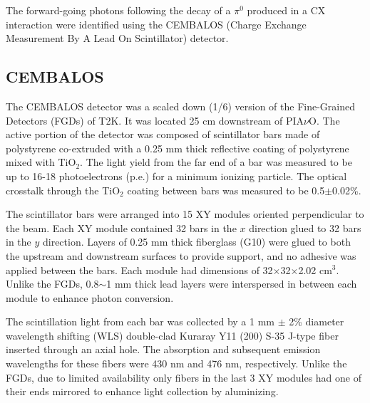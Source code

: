 The forward-going photons following the decay of a $\pi^0$ produced in a CX interaction were identified using the CEMBALOS (Charge Exchange Measurement By A Lead On Scintillator) detector.

\subsection{CEMBALOS}
The CEMBALOS detector was a scaled down (1/6) version of the Fine-Grained Detectors (FGDs) \cite{fgd} of T2K. It was located 25 cm downstream of PIA$\nu$O. {\color{red}The active portion of the detector was composed of} scintillator bars made of polystyrene co-extruded with a 0.25 mm thick reflective coating of polystyrene mixed with TiO$_2$. The light yield from the far end of a bar was measured to be up to 16-18 photoelectrons (p.e.) for a minimum ionizing particle. The optical crosstalk through the TiO$_2$ coating between bars was measured to be 0.5$\pm$0.02\%. 

The scintillator bars were arranged into 15 XY modules oriented perpendicular to the beam. Each XY module contained 32 bars in the $x$ direction glued to 32 bars in the $y$ direction. Layers of 0.25 mm thick fiberglass (G10) were glued to both the upstream and downstream surfaces to provide support, and no adhesive was applied between the bars. Each module had dimensions of 32$\times$32$\times$2.02 cm$^3$. Unlike the FGDs, 0.8$\sim$1 mm thick lead layers were interspersed in between each module to enhance photon conversion. 


The scintillation light from each bar was collected by a 1 mm $\pm$ 2\% diameter wavelength shifting (WLS) double-clad Kuraray Y11 (200) S-35 J-type fiber inserted through an axial hole. The absorption and subsequent emission wavelengths for these fibers were 430 nm and 476 nm, respectively. Unlike the FGDs, due to limited availability only fibers in the last 3 XY modules had one of their ends mirrored to enhance light collection by aluminizing.

